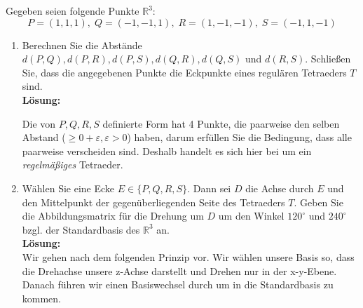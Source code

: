 \documentclass[11pt,a4paper,ngerman]{article}
\newcommand{\R}{\mathbb{R}}
\begin{document}
Gegeben seien folgende Punkte $\mathbb{R}^3:$
$$
P=(1,1,1),\; Q=(-1,-1,1),\; R=(1,-1,-1),\; S=(-1,1,-1)
$$
\begin{enumerate}[\bfseries (a)]

\item Berechnen Sie die Abstände $d(P,Q), d(P,R), d(P,S), d(Q,R), d(Q,S)$ und $d(R,S)$. Schließen Sie, dass die angegebenen Punkte die Eckpunkte eines regulären Tetraeders $T$ sind.\\

\textbf{Lösung:}


Die von $P,Q,R,S$ definierte Form hat 4 Punkte, die paarweise den selben Abstand ($\geq 0+ \varepsilon, \varepsilon > 0$) haben, darum erfüllen Sie die Bedingung, dass alle paarweise verscheiden sind. Deshalb handelt es sich hier bei um ein \emph{regelmäßiges} Tetraeder.


\item Wählen Sie eine Ecke $E \in \{  P,Q,R,S\} $. Dann sei $D$ die Achse durch $E$ und den Mittelpunkt der gegenüberliegenden Seite des Tetraeders $T$. Geben Sie die Abbildungsmatrix für die Drehung um $D$ um den Winkel $120^\circ$ und $240^\circ$ bzgl. der Standardbasis des $\R ^3$ an.\\

\textbf{Lösung:}\\
Wir gehen nach dem folgenden Prinzip vor. Wir wählen unsere Basis so, dass die Drehachse unsere z-Achse darstellt und Drehen nur in der x-y-Ebene. Danach führen wir einen Basiswechsel durch um in die Standardbasis zu kommen.\\


\end{enumerate}
\end{document}
